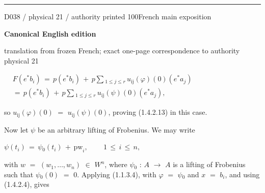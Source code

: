 \documentclass[9pt]{article}
\newcommand{\CanonText}[1]{\par{\fontsize{8.0}{9.35}\selectfont\RaggedRight #1\par}\vspace{2.2pt}}
\newcommand{\CanonDisplay}[1]{\par\vspace{1.2pt}\begin{center}{\fontsize{7.2}{8.4}\selectfont\(\displaystyle #1\)}\end{center}\vspace{1.2pt}}
\newenvironment{CanonMathBlock}{\par\vspace{1.2pt}\begin{center}\fontsize{6.8}{8.0}\selectfont\(\displaystyle}{\)\end{center}\vspace{1.2pt}}
\newcommand{\LayerTitle}{Canonical English edition}
\begin{document}
\begin{minipage}[t][\dimexpr\textheight-5pt\relax][t]{\textwidth}
\vfill
{\color{Accent}\hrule height 0.35pt}\vspace{3pt}
\end{minipage}
\newpage
\noindent\begin{minipage}[t][\dimexpr\textheight-5pt\relax][t]{\textwidth}
{\sffamily\fontsize{7.3}{8.2}\selectfont\color{Quiet} D038 / physical 21 / authority printed 100\hfill French main exposition}
\par{}\vspace{4.5pt}
{\sffamily\fontsize{10.4}{11.6}\selectfont\bfseries\color{Accent} \LayerTitle}
\par{\sffamily\fontsize{6.7}{7.7}\selectfont\color{Quiet} translation from frozen French; exact one-page correspondence to authority physical 21}
\vspace{5pt}
\begin{CanonMathBlock}
\begin{aligned}
& F(e^{*}b_{i})\,=\,p(e^{*}b_{i})\,+\,p\sum{}_{1\leq{}j\leq{}r}\,u_{\mathrm{ij}}(\varphi{})(0)(e^{*}a_{j})\\
& =\,p(e^{*}b_{i})\,+\,p\sum{}_{1\leq{}j\leq{}r}\,u_{\mathrm{ij}}(\psi{})(0)(e^{*}a_{j}),
\end{aligned}
\end{CanonMathBlock}
\CanonText{so \(u_{\mathrm{ij}}(\varphi{})(0)\) \(=\) \(u_{\mathrm{ij}}(\psi{})(0)\), proving (1.4.2.13) in this case.}
\CanonText{Now let \(\psi{}\) be an arbitrary lifting of Frobenius. We may write}
\CanonDisplay{\psi{}(t_{i})\,=\,\psi{}_{0}(t_{i})\,+\,\text{pw}_{i},\qquad\,1\,\leq{}\,i\,\leq{}\,n,}
\CanonText{with \(w\) \(=\) \((w_{1},\ldots{},w_{n})\) \(\in{}\) \(W^{n}\), where \(\psi{}_{0}\) : \(A\) \(\to{}\) \(A\) is a lifting of Frobenius such that \(\psi{}_{0}(0)\) \(=\) 0. Applying (1.1.3.4), with \(\varphi{}\) \(=\) \(\psi{}_{0}\) and \(x\) \(=\) \(b_{i}\), and using (1.4.2.4), gives}

\end{minipage}
\end{document}
